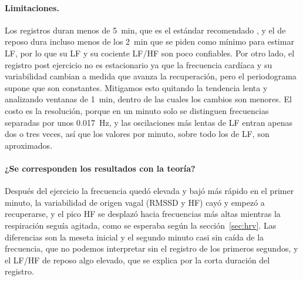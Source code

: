 \paragraph{Limitaciones.}
Los registros duran menos de \SI{5}{\minute}, que es el estándar recomendado \parencite{taskforce1996}, y el de reposo dura incluso menos de los \SI{2}{\minute} que se piden como mínimo para estimar LF, por lo que su LF y su cociente LF/HF son poco confiables. Por otro lado, el registro post ejercicio no es estacionario ya que la frecuencia cardíaca y su variabilidad cambian a medida que avanza la recuperación, pero el periodograma supone que son constantes. Mitigamos esto quitando la tendencia lenta y analizando ventanas de \SI{1}{\minute}, dentro de las cuales los cambios son menores. El costo es la resolución, porque en un minuto solo se distinguen frecuencias separadas por unos \SI{0.017}{\hertz}, y las oscilaciones más lentas de LF entran apenas dos o tres veces, así que los valores por minuto, sobre todo los de LF, son aproximados.

\paragraph{¿Se corresponden los resultados con la teoría?}
Después del ejercicio la frecuencia quedó elevada y bajó más rápido en el primer minuto, la variabilidad de origen vagal (RMSSD y HF) cayó y empezó a recuperarse, y el pico HF se desplazó hacia frecuencias más altas mientras la respiración seguía agitada, como se esperaba según la sección~\ref{sec:hrv}. Las diferencias son la meseta inicial y el segundo minuto casi sin caída de la frecuencia, que no podemos interpretar sin el registro de los primeros segundos, y el LF/HF de reposo algo elevado, que se explica por la corta duración del registro.
